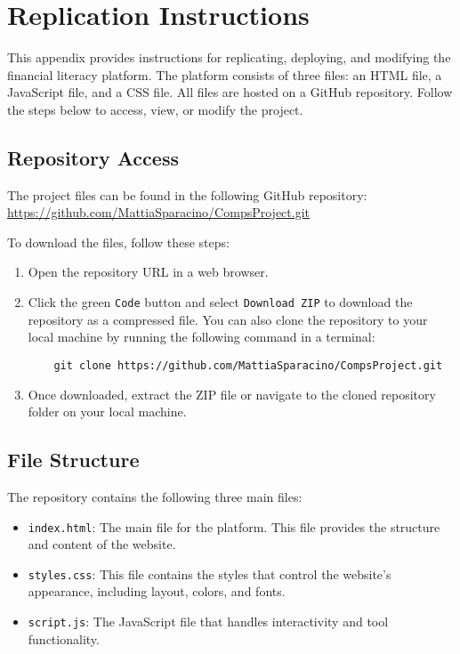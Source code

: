 \documentclass[11pt,twocolumn]{article}
\begin{document}
\appendix
\section{Replication Instructions}

This appendix provides instructions for replicating, deploying, and modifying the financial literacy platform. The platform consists of three files: an HTML file, a JavaScript file, and a CSS file. All files are hosted on a GitHub repository. Follow the steps below to access, view, or modify the project.

\subsection{Repository Access}
The project files can be found in the following GitHub repository:
\url{https://github.com/MattiaSparacino/CompsProject.git}

To download the files, follow these steps:
\begin{enumerate}
    \item Open the repository URL in a web browser.
    \item Click the green \texttt{Code} button and select \texttt{Download ZIP} to download the repository as a compressed file. You can also clone the repository to your local machine by running the following command in a terminal:
       {\scriptsize
    \begin{verbatim}
    git clone https://github.com/MattiaSparacino/CompsProject.git
    \end{verbatim}
    }
    \item Once downloaded, extract the ZIP file or navigate to the cloned repository folder on your local machine.
\end{enumerate}

\subsection{File Structure}
The repository contains the following three main files:
\begin{itemize}
    \item \texttt{index.html}: The main file for the platform. This file provides the structure and content of the website.
    \item \texttt{styles.css}: This file contains the styles that control the website’s appearance, including layout, colors, and fonts.
    \item \texttt{script.js}: The JavaScript file that handles interactivity and tool functionality.
\end{itemize}
\end{document}
